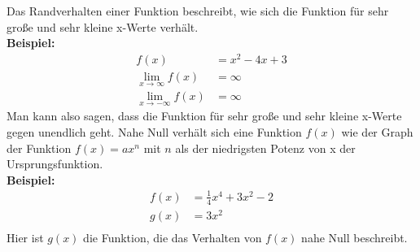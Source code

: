 \documentclass[25pt, a3paper, portrait]{tikzposter}
\begin{document}
\begin{columns}
    {
        Das Randverhalten einer Funktion beschreibt, wie sich die Funktion für sehr große und sehr kleine x-Werte verhält. \\
        \textbf{Beispiel:}
        \begin{align*}
            f(x)                      & = x^2 - 4x + 3 \\
            \lim_{x \to \infty} f(x)  & = \infty       \\
            \lim_{x \to -\infty} f(x) & = \infty
        \end{align*}
        Man kann also sagen, dass die Funktion für sehr große und sehr kleine x-Werte gegen unendlich geht.
    }
    {
        Nahe Null verhält sich eine Funktion $f(x)$ wie der Graph der Funktion $f(x) = ax^n$ mit $n$ als der niedrigsten Potenz von x der Ursprungsfunktion. \\
        \textbf{Beispiel:}
        \begin{align*}
            f(x) & = \frac{1}{4}x^4 + 3x^2 - 2 \\
            g(x) & = 3x^2                      \\
        \end{align*}
        Hier ist $g(x)$ die Funktion, die das Verhalten von $f(x)$ nahe Null beschreibt.
    }
\end{columns}
\end{document}
